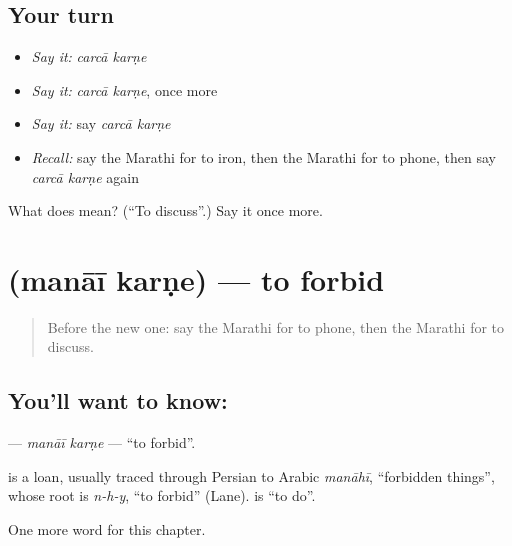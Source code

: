 \subsection*{Your turn}
\begin{itemize}
\raggedright
  \item \emph{Say it:} \emph{carcā karṇe}
  \item \emph{Say it:} \emph{carcā karṇe}, once more
  \item \emph{Say it:} say \emph{carcā karṇe}
  \item \emph{Recall:} say the Marathi for to iron, then the Marathi for to phone, then say \emph{carcā karṇe} again
\end{itemize}

\begin{tcolorbox}[breakable,colback=teal!4,colframe=teal!35!black,title={Before you move on}]
What does   mean? (\textquotedblleft{}To discuss\textquotedblright{}.) Say it once more.
\end{tcolorbox}
\section[\texorpdfstring{\mr{मनाई} \mr{करणे} (manāī karṇe)}{मनाई करणे (manāī karṇe)}]{  (manāī karṇe) — to forbid}

\label{lesson:MR-C194-manai-karne}



\begin{quote}
Before the new one: say the Marathi for to phone, then the Marathi for to discuss.
\end{quote}

\subsection*{You'll want to know:  }
\textbf{ } — \emph{manāī karṇe} — \textquotedblleft{}to forbid\textquotedblright{}.

\begin{cousinweb}
\textbf{} is a loan, usually traced through Persian to Arabic \emph{manāhī}, \textquotedblleft{}forbidden things\textquotedblright{}, whose root is \emph{n-h-y}, \textquotedblleft{}to forbid\textquotedblright{} (Lane). \textbf{} is \textquotedblleft{}to do\textquotedblright{}.
\end{cousinweb}

\begin{grammarlens}[title={What you've built}]
One more word for this chapter.
\end{grammarlens}

